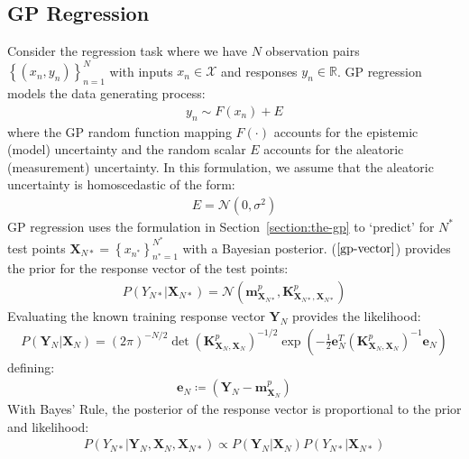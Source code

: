 \documentclass{article}
\numberwithin{equation}{section}
\begin{document}
\subsection{GP Regression}
Consider the regression task where we have $N$ observation pairs $\left\{(x_n, y_n)\right\}_{n=1}^{N}$ with inputs $x_n \in \mathcal{X}$ and responses $y_n \in \mathbb{R}$. GP regression models the data generating process:
\begin{align}
    y_n \sim F(x_n) + E
    \label{regression-data-uncertainties}
\end{align}
where the GP random function mapping $F(\cdot)$ accounts for the epistemic (model) uncertainty and the random scalar $E$ accounts for the aleatoric (measurement) uncertainty. In this formulation, we assume that the aleatoric uncertainty is homoscedastic of the form:
\begin{align}
    E = \mathcal{N} \left(0, \sigma^2\right)
    \label{aleotric-uncertainty}
\end{align}
GP regression uses the formulation in Section~\ref{section:the-gp} to `predict' for $N^*$ test points $\mathbf{X}_{N*} = \left\{ x_{n^*}\right\}_{n^*=1}^{N^*}$ with a Bayesian posterior. ($\ref{gp-vector}$) provides the prior for the response vector of the test points:
\begin{align}
    \label{gp-prior}
    P\left(Y_{N*}\vert \mathbf{X}_{N*}\right) = \mathcal{N}\left(\mathbf{m}^p_{\mathbf{X}_{N*}}, \mathbf{K}^p_{\mathbf{X}_{N*}, \mathbf{X}_{N*}}\right)
\end{align}
Evaluating the known training response vector $\mathbf{Y}_{N}$ provides the likelihood:
\begin{align}
     \label{gp-likelihood}
    P\left(\mathbf{Y}_{N} \vert \mathbf{X}_{N} \right) = \left(2 \pi\right)^{-N/2} \det\left(\mathbf{K}^p_{\mathbf{X}_{N}, \mathbf{X}_{N}}\right)^{-1/2} \exp\left(-\frac{1}{2}\mathbf{e}_N^T\left(\mathbf{K}^p_{\mathbf{X}_{N}, \mathbf{X}_{N}}\right)^{-1}\mathbf{e}_N\right)
    \label{likelihood-normal}
\end{align}
defining:
\begin{align}
    \mathbf{e}_N \coloneqq \left(\mathbf{Y}_N - \mathbf{m}^p_{\mathbf{X}_{N}} \right)
    \label{mean-error-definition}
\end{align}
With Bayes' Rule, the posterior of the response vector is proportional to the prior and likelihood:
\begin{align}
     P\left(Y_{N*} | \mathbf{Y}_{N},  \mathbf{X}_{N},  \mathbf{X}_{N*}\right) \propto P\left(\mathbf{Y}_{N} \vert \mathbf{X}_{N} \right) P\left(Y_{N*}\vert \mathbf{X}_{N*}\right)
    \label{bayes-posterior}
\end{align}
\end{document}
